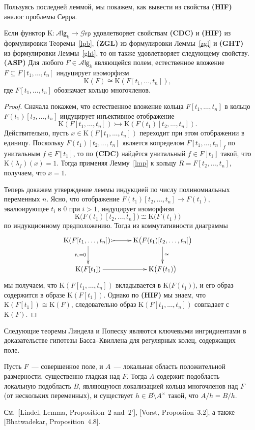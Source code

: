 \documentclass[oneside, 11pt]{amsart} \pdfoutput=1
\begin{document}
Пользуясь последней леммой, мы покажем, как вывести из свойства {\bf(HIF)} аналог проблемы Серра.
\begin{lemma}
\label{asp}
Если функтор $\mathrm K\colon\mathcal A\mathsf{lg}_k\rightarrow\mathcal G\mathsf{rp}$ удовлетворяет свойствам {\bf(CDC)} и {\bf(HIF)} из формулировки Теоремы~\ref{lpb}, {\bf(ZGL)} из формулировки Леммы~\ref{zgl} и {\bf(GHT)} из формулировки Леммы~\ref{ght}, то он также удовлетворяет следующему свойству.\\
{\bf(ASP)} Для любого $F\in\mathcal A\mathsf{lg}_k$ являющейся полем, естественное вложение $F\subseteq F[t_1,\ldots,t_n]$ индуцирует изоморфизм
$$
\mathrm K(F)\cong\mathrm K(F[t_1,\ldots,t_n]),
$$
где $F[t_1,\ldots,t_n]$ обозначает кольцо многочленов.
\end{lemma}
\begin{proof}
Сначала покажем, что естественное вложение кольца $F[t_1,\ldots,t_n]$ в кольцо $F(t_1)[t_2,\ldots,t_n]$ индуцирует инъективное отображение
$$
\mathrm K(F[t_1,\ldots,t_n])\rightarrowtail\mathrm K(F(t_1)[t_2,\ldots,t_n]).
$$
Действительно, пусть $x\in\mathrm K(F[t_1,\ldots,t_n])$ переходит при этом отображении в единицу. Поскольку $F(t_1)[t_2,\ldots,t_n]$ является копределом $F[t_1,\ldots,t_n]_f$ по унитальным $f\in F[t_1]$, то по {\bf(CDC)} найдётся унитальный $f\in F[t_1]$ такой, что $\mathrm K(\lambda_f)(x)=1$. Тогда применяя Лемму~\ref{lmp} к кольцу $R=F[t_2,\ldots,t_n]$, получаем, что $x=1$. 

Теперь докажем утверждение леммы индукцией по числу полиномиальных переменных $n$. Ясно, что отображение $F(t_1)[t_2,\ldots,t_n]\rightarrow F(t_1)$, эвалюирующее $t_i$ в $0$ при $i>1$, индуцирует изоморфизм
$$
\mathrm K\big(F(t_1)[t_2,\ldots,t_n]\big)\cong\mathrm K\big(F(t_1)\big)
$$
по индукционному предположению. Тогда из коммутативности диаграммы
$$
\xymatrix{
\mathrm K(F[t_1,\ldots,t_n])\ \ar@{>->}[r]\ar[d]_{t_i=0}&\mathrm K\big(F(t_1)[t_2,\ldots,t_n]\big)\ar[d]^{\cong}\\
\mathrm K(F[t_1])\ar[r]&\mathrm K\big(F(t_1)\big)
}
$$
мы получаем, что $\mathrm K(F[t_1,\ldots,t_n])$ вкладывается в $\mathrm K\big(F(t_1)\big)$, и его образ содержится в образе $\mathrm K(F[t_1])$. Однако по {\bf(HIF)} мы знаем, что $\mathrm K(F[t_1])\cong\mathrm K(F)$, следовательно образ $\mathrm K(F[t_1,\ldots,t_n])$ совпадает с $\mathrm K(F)$.
\end{proof}

Следующие теоремы Линдела и Попеску являются ключевыми ингридиентами в доказательстве гипотезы Басса--Квиллена для регулярных колец, содержащих поле. 
\begin{theorem}[Lindel]
\label{lindel}
Пусть $F$~--- совершенное поле, и $A$~--- локальная область положительной размерности, существенно гладкая над $F$. Тогда $A$ содержит подобласть локальную подобласть $B$, являющуюся локализацией кольца многочленов над $F$ {\rm(}от нескольких переменных{\rm)}, и существует $h\in B\setminus A^\times$ такой, что $A/h=B/h$. 
\end{theorem}
См.~[Lindel, Lemma, Proposition~2 and~2'], [Vorst, Proposiion~3.2], а также [Bhatwadekar, Proposition~4.8].
\end{document}
